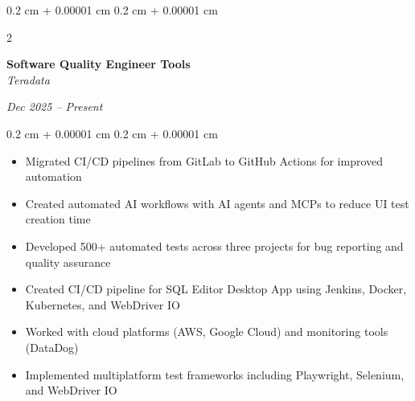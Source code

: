 \documentclass[10pt, letterpaper]{article}
\newenvironment{onecolentry}{
    \begin{adjustwidth}{
        0.2 cm + 0.00001 cm
    }{
        0.2 cm + 0.00001 cm
    }
}{
    \end{adjustwidth}
} %
\newenvironment{twocolentry}[2][]{
    \onecolentry
    \def\secondColumn{#2}
    \setcolumnwidth{\fill, 4.5 cm}
    \begin{paracol}{2}
}{
    \switchcolumn \raggedleft \secondColumn
    \end{paracol}
    \endonecolentry
} %
\begin{document}
    \vspace{0.2 cm}
    \begin{twocolentry}{
    \textit{Dec 2025 – Present}}
        \textbf{Software Quality Engineer Tools} \\
        \textit{Teradata}
    \end{twocolentry}
    \begin{onecolentry}
        \begin{itemize}
            \item Migrated CI/CD pipelines from GitLab to GitHub Actions for improved automation
            \item Created automated AI workflows with AI agents and MCPs to reduce UI test creation time
            \item Developed 500+ automated tests across three projects for bug reporting and quality assurance
            \item Created CI/CD pipeline for SQL Editor Desktop App using Jenkins, Docker, Kubernetes, and WebDriver IO
            \item Worked with cloud platforms (AWS, Google Cloud) and monitoring tools (DataDog)
            \item Implemented multiplatform test frameworks including Playwright, Selenium, and WebDriver IO
        \end{itemize}
    \end{onecolentry}
\end{document}

